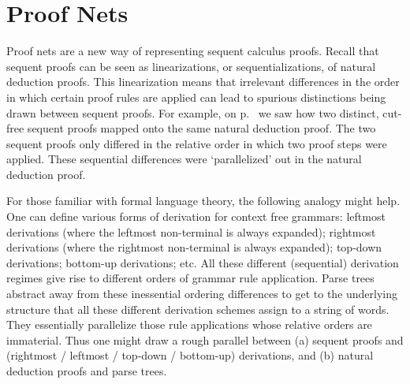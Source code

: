 \chapter{Proof Nets}

Proof nets are a new way of representing sequent calculus proofs.
Recall that sequent proofs can be seen as linearizations,  or
sequentializations, of natural deduction proofs.  This linearization
means that irrelevant differences in the order in which certain proof
rules are applied can lead to spurious distinctions being drawn between
sequent proofs.  For example, on p.~\pageref{???} we saw how two distinct,
cut-free sequent proofs mapped onto the same natural deduction proof.
The two sequent proofs only differed in the relative order in which
two proof steps were applied.  These sequential differences were
`parallelized' out in the natural deduction proof.

For those familiar with formal language
theory, the following analogy might help.  One can define various forms
of derivation for context free grammars: leftmost derivations (where the
leftmost non-terminal is always expanded); rightmost derivations (where
the rightmost non-terminal is always expanded); top-down derivations; 
bottom-up derivations; etc.  All these different (sequential) derivation
regimes give rise to different orders of grammar rule application.
Parse trees abstract away from these inessential ordering differences to
get to the underlying structure that all these different derivation schemes
assign to a string of words.  They essentially parallelize those rule 
applications whose relative orders are immaterial.
Thus one might draw a rough parallel between
(a) sequent proofs and (rightmost / leftmost / top-down / bottom-up)
derivations, and (b) natural deduction proofs and parse trees.


